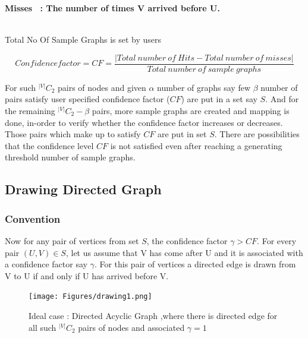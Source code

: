 \documentclass{article}
\begin{document}
\bf Misses \rm : The number of times V arrived before U.
\\\

Total No Of Sample Graphs is set by users

\begin{equation}
Confidence factor = CF =\frac{| Total\ number\ of\ Hits- Total\ number\ of\ misses |}{Total\ number\ of\ sample\ graphs} 
\end{equation}

For such $^{|V|}C_2$  pairs of nodes and given $\alpha$ number of graphs say few $\beta$ number of pairs satisfy user specified confidence factor ($CF$) are put in a set say $S$. And for the remaining $^{|V|}C_2 - \beta$ pairs, more sample graphs are created and mapping is done, in-order to verify whether the confidence factor increases or decreases. Those pairs which make up to satisfy $CF$ are put in set $S$. There are possibilities that the confidence level $CF$ is not satisfied even after reaching a generating threshold number of sample graphs.    

\subsection {Drawing Directed Graph}
\subsubsection{Convention}
\hspace{.17in}Now for any pair of vertices from set $S$, the confidence factor $\gamma > CF$. For every pair $(U,V) \in S$, let us assume that V has come after U and it is associated with a confidence factor say $\gamma$. For this pair of vertices a directed edge is drawn from V to U if and only if U has arrived before V.
\begin{figure}[htp]
\centering
\texttt{[image: Figures/drawing1.png]}
\caption{Ideal case : Directed Acyclic Graph ,where there is directed edge for all such $^{|V|}C_2$ pairs of nodes and associated $\gamma = 1$  }
\label{}
\end{figure}
\end{document}
